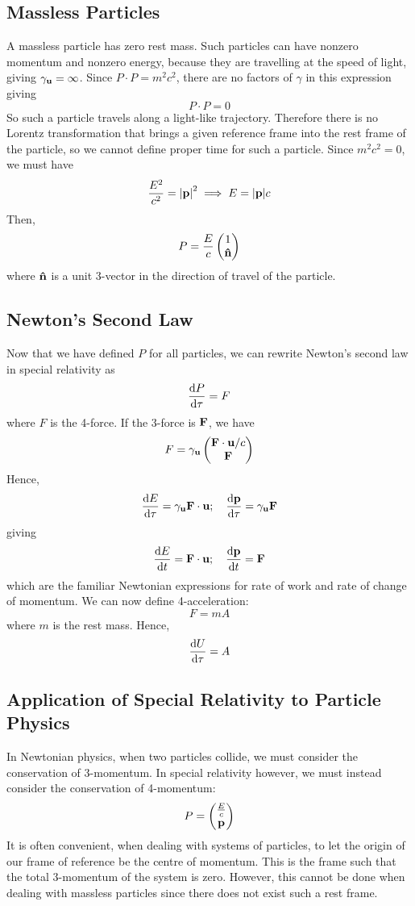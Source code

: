 \documentclass{article}
\begin{document}
\subsection{Massless Particles}
A massless particle has zero rest mass. Such particles can have nonzero momentum and nonzero energy, because they are travelling at the speed of light, giving $\gamma_{\vb u} = \infty$. Since $P \cdot P = m^2c^2$, there are no factors of $\gamma$ in this expression giving
\[ P \cdot P = 0 \]
So such a particle travels along a light-like trajectory. Therefore there is no Lorentz transformation that brings a given reference frame into the rest frame of the particle, so we cannot define proper time for such a particle. Since $m^2c^2 = 0$, we must have
\[ \frac{E^2}{c^2} = \abs{\vb p}^2 \implies E = \abs{\vb p}c \]
Then,
\[ P = \frac{E}{c} \begin{pmatrix}
		1 \\ \vu n
	\end{pmatrix} \]
where $\vu n$ is a unit 3-vector in the direction of travel of the particle.

\subsection{Newton's Second Law}
Now that we have defined $P$ for all particles, we can rewrite Newton's second law in special relativity as
\[ \dv{P}{\tau} = F \]
where $F$ is the 4-force. If the 3-force is $\vb F$, we have
\[ F = \gamma_{\vb u} \begin{pmatrix}
		\vb F \cdot \vb u / c \\
		\vb F
	\end{pmatrix} \]
Hence,
\[ \dv{E}{\tau} = \gamma_{\vb u} \vb F \cdot \vb u;\quad \dv{\vb p}{\tau} = \gamma_{\vb u} \vb F \]
giving
\[ \dv{E}{t} = \vb F \cdot \vb u;\quad \dv{\vb p}{t} = \vb F \]
which are the familiar Newtonian expressions for rate of work and rate of change of momentum. We can now define 4-acceleration:
\[ F = mA \]
where $m$ is the rest mass. Hence,
\[ \dv{U}{\tau} = A \]

\subsection{Application of Special Relativity to Particle Physics}
In Newtonian physics, when two particles collide, we must consider the conservation of 3-momentum. In special relativity however, we must instead consider the conservation of 4-momentum:
\[ P = \begin{pmatrix}
		\frac{E}{c} \\ \vb p
	\end{pmatrix} \]
It is often convenient, when dealing with systems of particles, to let the origin of our frame of reference be the centre of momentum. This is the frame such that the total 3-momentum of the system is zero. However, this cannot be done when dealing with massless particles since there does not exist such a rest frame.
\end{document}
